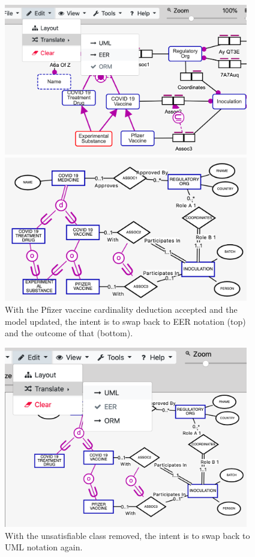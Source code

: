 \documentclass[sn-mathphys]{sn-jnl}
\begin{document}
\begin{figure}[h]
  \centering
      \includegraphics[width=0.95\textwidth]{covidORM2toER2.pdf} 
            
      \vspace{1mm}
      
            \includegraphics[width=0.95\textwidth]{covidER2.pdf} 
    \caption{With the  {\sf Pfizer vaccine} cardinality deduction accepted and the model updated, the intent is to swap back to EER notation (top) and the outcome of that (bottom).}
    \label{fig:ORM2toER}
\end{figure}

\begin{figure}[h]
  \centering
      \includegraphics[width=0.95\textwidth]{covidER2toUML.pdf} 
    \caption{With the unsatisfiable class removed, the intent is to swap back to UML notation again.}
    \label{fig:ER2toUML}
\end{figure}
\end{document}
